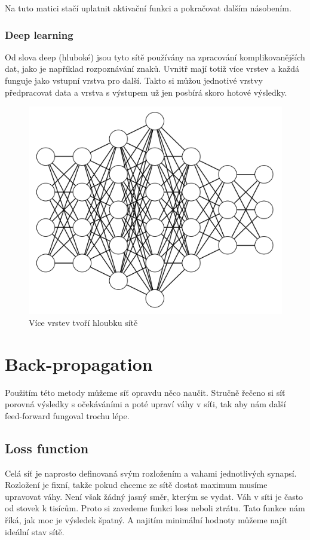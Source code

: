 \documentclass[12pt,a4paper]{report}
\begin{document}
		Na tuto matici stačí uplatnit aktivační funkci a pokračovat dalším násobením.
		
		\subsection{Deep learning}
		Od slova deep (hluboké) jsou tyto sítě používány na zpracování komplikovanějších dat, jako je například rozpoznávání znaků. Uvnitř mají totiž více vrstev a každá funguje jako vstupní vrstva pro další. Takto si můžou jednotivé vrstvy předpracovat data a vrstva s výstupem už jen posbírá skoro hotové výsledky.
		\begin{figure}[h]
			\centering
			\includegraphics[width=15cm]{images/nn4-4-5-6-4-3-3}
			\caption{Více vrstev tvoří hloubku sítě}
		\end{figure}
\chapter{Back-propagation}
Použitím této metody můžeme síť opravdu něco naučit. Stručně řečeno si síť porovná výsledky s očekáváními a poté upraví váhy v síťi, tak aby nám další feed-forward fungoval trochu lépe.
	\section{Loss function}
	Celá síť je naprosto definovaná svým rozložením a vahami jednotlivých synapsí. Rozložení je fixní, takže pokud chceme ze sítě dostat maximum musíme upravovat váhy. Není však žádný jasný směr, kterým se vydat. Váh v síti je často od stovek k tisícům. Proto si zavedeme funkci loss neboli ztrátu. Tato funkce nám říká, jak moc je výsledek špatný. A najitím minimální hodnoty můžeme najít ideální stav sítě.
\end{document}
